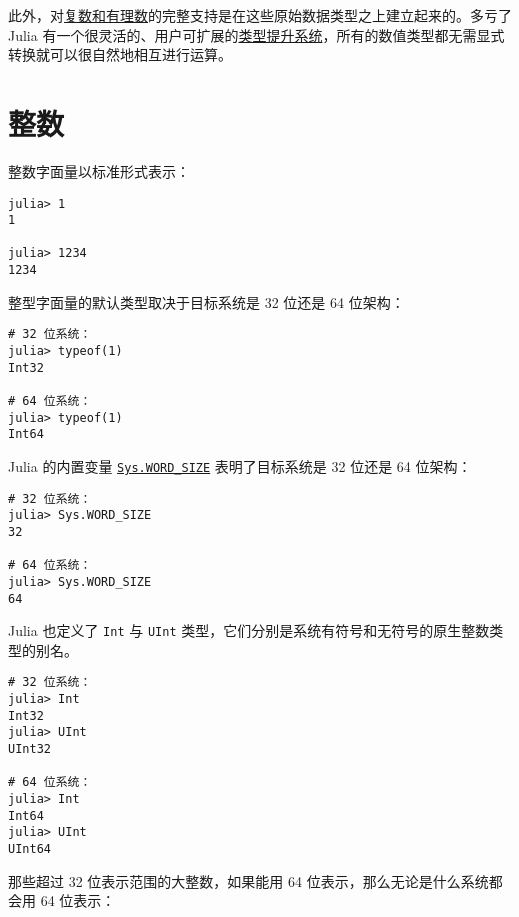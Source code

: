 此外，对\hyperlink{13366825053081777829}{复数和有理数}的完整支持是在这些原始数据类型之上建立起来的。多亏了 Julia 有一个很灵活的、用户可扩展的\hyperlink{10374023657104680331}{类型提升系统}，所有的数值类型都无需显式转换就可以很自然地相互进行运算。



\hypertarget{1329060658000677295}{}


\section{整数}



整数字面量以标准形式表示：




\begin{verbatim}
julia> 1
1

julia> 1234
1234
\end{verbatim}



整型字面量的默认类型取决于目标系统是 32 位还是 64 位架构：




\begin{verbatim}
# 32 位系统：
julia> typeof(1)
Int32

# 64 位系统：
julia> typeof(1)
Int64
\end{verbatim}



Julia 的内置变量 \hyperlink{6553323097149877235}{\texttt{Sys.WORD\_SIZE}} 表明了目标系统是 32 位还是 64 位架构：




\begin{verbatim}
# 32 位系统：
julia> Sys.WORD_SIZE
32

# 64 位系统：
julia> Sys.WORD_SIZE
64
\end{verbatim}



Julia 也定义了 \texttt{Int} 与 \texttt{UInt} 类型，它们分别是系统有符号和无符号的原生整数类型的别名。




\begin{verbatim}
# 32 位系统：
julia> Int
Int32
julia> UInt
UInt32

# 64 位系统：
julia> Int
Int64
julia> UInt
UInt64
\end{verbatim}



那些超过 32 位表示范围的大整数，如果能用 64 位表示，那么无论是什么系统都会用 64 位表示：




